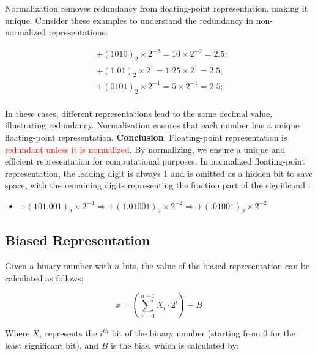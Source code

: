 \documentclass[12pt,openany]{book}
\begin{document}
			      	Normalization removes redundancy from floating-point representation, making it unique. Consider these examples to understand the redundancy in non-normalized representations:
			      	
			      	\[
			      		\begin{aligned}
			      			  & + (1010)_2 \times 2^{-2} = 10 \times 2^{-2} = 2.5; \\
			      			  & + (1.01)_2 \times 2^{1} = 1.25 \times 2^{1} = 2.5; \\
			      			  & + (0101)_2 \times 2^{-1} = 5 \times 2^{-1}  = 2.5; \\
			      		\end{aligned}
			      	\]
			      	
			      	    
			      	In these cases, different representations lead to the same decimal value, illustrating redundancy. Normalization ensures that each number has a unique floating-point representation. 
			      	\vskip 0.5cm
			      	\textbf{Conclusion}: Floating-point representation is \textcolor{red}{redundant unless it is normalized}. By normalizing, we ensure a unique and efficient representation for computational purposes.
			      	\vskip 0.5cm
			      	In normalized floating-point representation, the leading digit is always 1 and is omitted as a hidden bit to save space, with the remaining digits representing the fraction part of the significand :
			      	\begin{itemize}
			      		\item[] \( +(101.001)_2 \times 2^{-4} \Rightarrow +(1.01001)_2 \times 2^{-2} \Rightarrow +(.01001)_2 \times 2^{-2} \)
			      	\end{itemize}
			      	
			      	
			      	
			      	
			      	\newpage
			      	\subsection{Biased Representation}
			      	
			      	Given a binary number with $n$ bits, the value of the biased representation can be calculated as follows:
			      	
			      	\[
			      		x = (\sum_{i=0}^{n-1} X_i \cdot 2^i) - B
			      	\]
			      	
			      	Where $X_i$ represents the $i^{th}$ bit of the binary number (starting from 0 for the least significant bit), and $B$ is the bias, which is calculated by:
			      	
\end{document}
